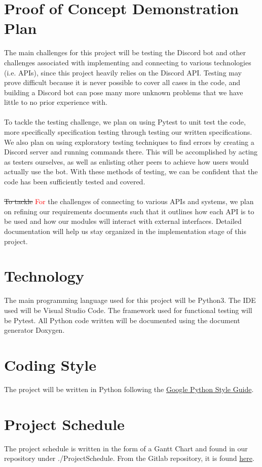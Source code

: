 \documentclass[12pt, titlepage]{article}
\begin{document}
\section{Proof of Concept Demonstration Plan}
The main challenges for this project will be testing the Discord bot and other challenges associated with implementing and connecting to various technologies (i.e. APIs), since this project heavily relies on the Discord API. Testing may prove difficult because it is never possible to cover all cases in the code, and building a Discord bot can pose many more unknown problems that we have little to no prior experience with.\\ \\
To tackle the testing challenge, we plan on using Pytest to unit test the code, more specifically specification testing through testing our written specifications. We also plan on using exploratory testing techniques to find errors by creating a Discord server and running commands there. This will be accomplished by acting as testers ourselves, as well as enlisting other peers to achieve how users would actually use the bot. With these methods of testing, we can be confident that the code has been sufficiently tested and covered.\\ \\
\sout{To tackle} \textcolor{red}{For} the challenges of connecting to various APIs and systems, we plan on refining our requirements documents such that it outlines how each API is to be used and how our modules will interact with external interfaces. Detailed documentation will help us stay organized in the implementation stage of this project.


\section{Technology}
The main programming language used for this project will be Python3. The IDE used will be Visual Studio Code. The framework used for functional testing will be Pytest. All Python code written will be documented using the document generator Doxygen.

\section{Coding Style}
The project will be written in Python following the \href{https://google.github.io/styleguide/pyguide.html}{Google Python Style Guide}.

\section{Project Schedule}
The project schedule is written in the form of a Gantt Chart and found in our repository under ./ProjectSchedule. From the Gitlab repository, it is found \href{https://gitlab.cas.mcmaster.ca/modia1/ScrumBot/tree/master/ProjectSchedule}{here}.
\end{document}
